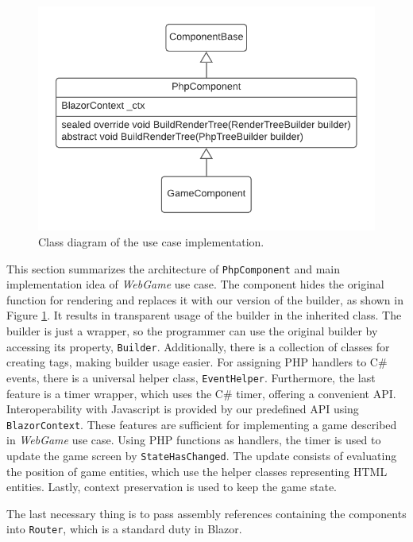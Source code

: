 \begin{figure}[t!]
\centering
\includegraphics[scale=0.8]{./img/PhpComponentSolution}
\caption{Class diagram of the use case implementation.}
\label{img17:solution}
\end{figure}
\par
This section summarizes the architecture of \texttt{PhpComponent} and main implementation idea of \textit{WebGame} use case.
The component hides the original function for rendering and replaces it with our version of the builder, as shown in Figure \ref{img17:solution}.
It results in transparent usage of the builder in the inherited class.
The builder is just a wrapper, so the programmer can use the original builder by accessing its property, \texttt{Builder}.
Additionally, there is a collection of classes for creating tags, making builder usage easier.
For assigning PHP handlers to C\# events, there is a universal helper class, \texttt{EventHelper}.
Furthermore, the last feature is a timer wrapper, which uses the C\# timer, offering a convenient API.
Interoperability with Javascript is provided by our predefined API using \texttt{BlazorContext}.
These features are sufficient for implementing a game described in \textit{WebGame} use case.
Using PHP functions as handlers, the timer is used to update the game screen by \texttt{StateHasChanged}.
The update consists of evaluating the position of game entities, which use the helper classes representing HTML entities.
Lastly, context preservation is used to keep the game state.
\par
The last necessary thing is to pass assembly references containing the components into \texttt{Router}, which is a standard duty in Blazor.

